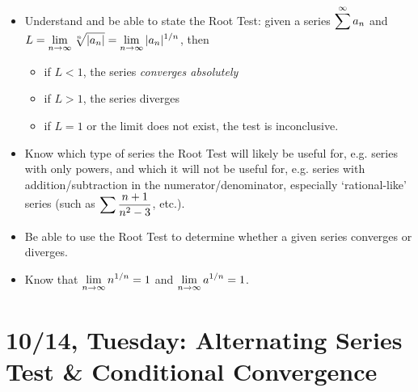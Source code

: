 \documentclass[11pt,letterpaper]{article}
\begin{document}
\begin{itemize}
\item Understand and be able to state the Root Test: given a series $\displaystyle\sum^\infty a_n$ and $\displaystyle L= \lim_{n \to \infty} \sqrt[n]{|a_n|}= \lim_{n \to \infty} |a_n|^{1/n}$, then
	\begin{itemize}
	\item if $L < 1$, the series \textit{converges absolutely}
	\item if $L > 1$, the series diverges
	\item if $L= 1$ or the limit does not exist, the test is inconclusive. 
	\end{itemize}

\item Know which type of series the Root Test will likely be useful for, e.g. series with only powers, and which it will not be useful for, e.g. series with addition/subtraction in the numerator/denominator, especially `rational-like' series (such as $\displaystyle\sum \dfrac{n + 1}{n^2 - 3}$, etc.).  

\item Be able to use the Root Test to determine whether a given series converges or diverges. 	

\item Know that $\displaystyle\lim_{n \to \infty} n^{1/n}= 1$ and $\displaystyle\lim_{n \to \infty} a^{1/n}= 1$. 
\end{itemize}

\newpage
\section*{10/14, Tuesday: Alternating Series Test \& Conditional Convergence\label{10-14}}
\end{document}
